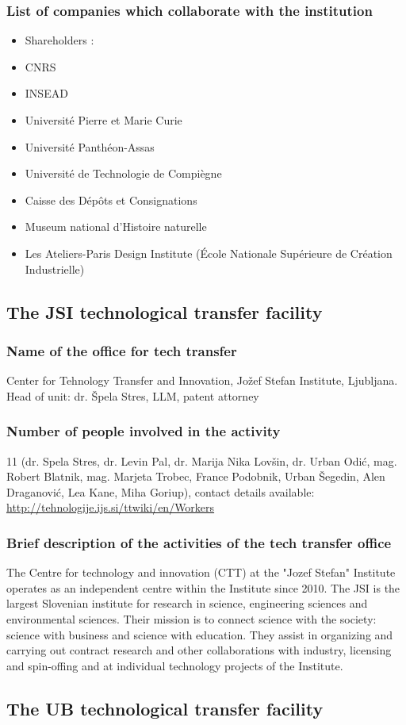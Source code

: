 \documentclass[12pt,a4paper,twoside]{article}
\begin{document}
\subsubsection{List of companies which collaborate with the institution}
\begin{itemize}
\item  Shareholders :
\item CNRS
\item INSEAD
\item Université Pierre et Marie Curie
\item Université Panthéon-Assas
\item Université de Technologie de Compiègne
\item Caisse des Dépôts et Consignations
\item Museum national d’Histoire naturelle
\item Les Ateliers-Paris Design Institute (École Nationale Supérieure de Création Industrielle)
\end{itemize}
 
\subsection{The JSI technological transfer facility}

\subsubsection{Name of the office for tech transfer}
Center for Tehnology Transfer and Innovation, Jožef Stefan Institute, Ljubljana. Head of unit: dr. Špela Stres, LLM, patent attorney 
\subsubsection{Number of people involved in the activity}

11 (dr. Spela Stres, dr. Levin Pal, dr. Marija Nika Lovšin, dr. Urban Odić, mag. Robert Blatnik, mag. Marjeta Trobec, France Podobnik, Urban Šegedin, Alen Draganović, Lea Kane, Miha Goriup), contact details available: \url{http://tehnologije.ijs.si/ttwiki/en/Workers}

\subsubsection{Brief description of the activities of the tech transfer office}
The Centre for technology and innovation (CTT) at the "Jozef Stefan" Institute operates as an independent centre within the Institute since 2010. The JSI is the largest Slovenian institute for research in science, engineering sciences and environmental sciences. Their mission is to connect science with the society: science with business and science with education. They assist in organizing and carrying out contract research and other collaborations with industry, licensing and spin-offing and at individual technology projects of the Institute.

\subsection{The UB technological transfer facility}

\end{document}
